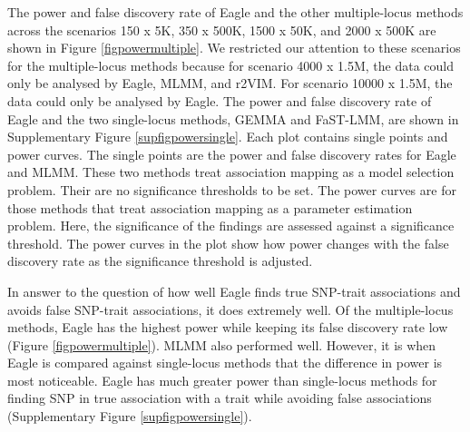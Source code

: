 \documentclass{nature}
\begin{document}
The power and false discovery rate of Eagle and the other multiple-locus methods across the scenarios 150 x 5K, 350 x 500K, 1500 x 50K, and 2000 x 500K are shown in Figure \ref{figpowermultiple}.  We restricted our attention to these scenarios for the multiple-locus methods because for scenario 4000 x 1.5M, 
the data could only be analysed by Eagle, MLMM, and r2VIM. For scenario 10000 x 1.5M, the data could only be analysed by Eagle. 
The power and false discovery rate of Eagle and the two single-locus methods, GEMMA and FaST-LMM,  are shown in
Supplementary Figure \ref{supfigpowersingle}.  Each plot contains 
single points and power curves. The single points are the power and false discovery rates for Eagle and MLMM.
These two methods treat association mapping as a model selection problem. Their are no significance thresholds to be set. 
The power curves are for those methods that treat association mapping as a parameter estimation problem. Here, the 
significance of the findings are assessed against a significance threshold. The power curves in the plot show how power changes with 
the false discovery rate as the significance threshold  is adjusted. 

In answer to the question of how well Eagle finds true SNP-trait associations and avoids false SNP-trait associations, it does extremely 
well.  Of the multiple-locus methods, Eagle has the highest power
while keeping its false discovery rate low (Figure \ref{figpowermultiple}). MLMM also performed well. However, it is when Eagle is compared against single-locus methods 
that the difference in power is most noticeable.  Eagle has much greater power than single-locus methods for finding SNP in true 
association with a trait while avoiding false associations (Supplementary Figure \ref{supfigpowersingle}). 



\end{document}

